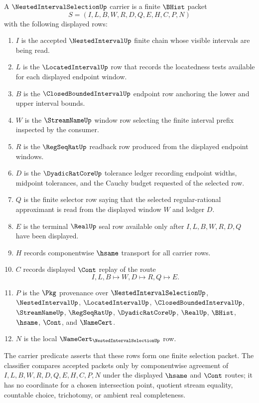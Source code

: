 \begin{definition}
\label{def:nested-interval-selection-carrier}
A $\NestedIntervalSelectionUp$ carrier is a finite $\BHist$ packet
$$
S=(I,L,B,W,R,D,Q,E,H,C,P,N)
$$
with the following displayed rows:
\begin{enumerate}
\item $I$ is the accepted $\NestedIntervalUp$ finite chain whose visible intervals are being read.
\item $L$ is the $\LocatedIntervalUp$ row that records the locatedness tests available for each displayed endpoint window.
\item $B$ is the $\ClosedBoundedIntervalUp$ endpoint row anchoring the lower and upper interval bounds.
\item $W$ is the $\StreamNameUp$ window row selecting the finite interval prefix inspected by the consumer.
\item $R$ is the $\RegSeqRatUp$ readback row produced from the displayed endpoint windows.
\item $D$ is the $\DyadicRatCoreUp$ tolerance ledger recording endpoint widths, midpoint tolerances, and the Cauchy budget requested of the selected row.
\item $Q$ is the finite selector row saying that the selected regular-rational approximant is read from the displayed window $W$ and ledger $D$.
\item $E$ is the terminal $\RealUp$ seal row available only after $I,L,B,W,R,D,Q$ have been displayed.
\item $H$ records componentwise $\hsame$ transport for all carrier rows.
\item $C$ records displayed $\Cont$ replay of the route
$$
I,L,B \longmapsto W,D \longmapsto R,Q \longmapsto E .
$$
\item $P$ is the $\Pkg$ provenance over $\NestedIntervalSelectionUp$, $\NestedIntervalUp$, $\LocatedIntervalUp$, $\ClosedBoundedIntervalUp$, $\StreamNameUp$, $\RegSeqRatUp$, $\DyadicRatCoreUp$, $\RealUp$, $\BHist$, $\hsame$, $\Cont$, and $\NameCert$.
\item $N$ is the local $\NameCert_{\NestedIntervalSelectionUp}$ row.
\end{enumerate}
The carrier predicate asserts that these rows form one finite selection packet. The classifier compares accepted packets only by componentwise agreement of $I,L,B,W,R,D,Q,E,H,C,P,N$ under the displayed $\hsame$ and $\Cont$ routes; it has no coordinate for a chosen intersection point, quotient stream equality, countable choice, trichotomy, or ambient real completeness.
\end{definition}

